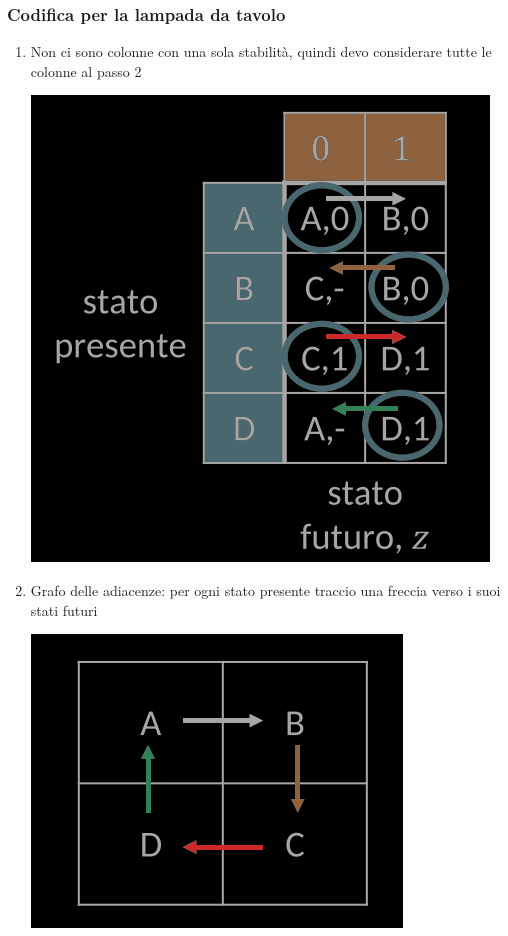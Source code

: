 \documentclass{article}
\begin{document}
\subsubsection*{Codifica per la lampada da tavolo}
\begin{enumerate}
    \item Non ci sono colonne con una sola stabilità, quindi devo considerare tutte le colonne al passo 2
    \begin{center}
        \includegraphics[scale=0.4]{lampadaC1.png}
    \end{center}
    \item Grafo delle adiacenze: per ogni stato presente traccio una freccia verso i suoi stati futuri
    \begin{center}
        \includegraphics[scale=0.35]{lampadaC2.png}

\end{center}
\end{enumerate}
\end{document}
